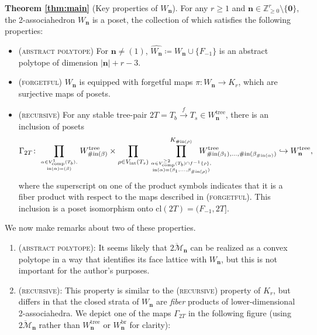 \documentclass[11pt]{amsart}
\theoremstyle{definition}
\theoremstyle{remark}
\theoremstyle{plain}
\newcommand\cM{\mathcal{M}}
\newcommand{\bZ}{\mathbb{Z}}
\newcommand\bn{\mathbf{n}}
\newcommand\bzero{\mathbf{0}}
\newcommand{\on}{\operatorname}
\newcommand{\comp}{C^2}
\renewcommand{\comp}{{\on{comp}}}
\newcommand{\incom}{\on{in}}
\newcommand{\inte}{{\on{int}}}
\newcommand{\tree}{{\on{tree}}}
\newcommand{\br}{{\on{br}}}
\newcommand{\cl}{\mathrm{cl}}
\newcommand{\ol}{\overline}
\newcommand{\sr}{\stackrel}
\newcommand{\wh}{\widehat}
\def\hra{\hookrightarrow}
\begin{document}
\begin{enumerate}
\noindent
{\bf Theorem \ref{thm:main}} (Key properties of $W_\bn$).
For any $r \geq 1$ and $\bn \in \bZ^r_{\geq0}\setminus\{\bzero\}$, the 2-associahedron $W_\bn$ is a poset, the collection of which satisfies the following properties:
\begin{itemize}
\item[] \textsc{(abstract polytope)} For $\bn \neq (1)$, $\wh{W_\bn} \coloneqq W_\bn \cup \{F_{-1}\}$ is an abstract polytope of dimension $|\bn| + r - 3$.

\item[] \textsc{(forgetful)} $W_\bn$ is equipped with forgetful maps $\pi\colon W_\bn \to K_r$, which are surjective maps of posets.

\item[] \textsc{(recursive)} For any stable tree-pair $2T = T_b \sr{f}{\to} T_s \in W_\bn^\tree$, there is an inclusion of posets
\begin{align}
\Gamma_{2T} \colon \prod_{
{\alpha \in V_\comp^1(T_b),}
\atop
{\incom(\alpha)=(\beta)}
} W_{\#\!\incom(\beta)}^\tree
\times
\prod_{\rho \in V_\inte(T_s)} \prod^{K_{\#\!\incom(\rho)}}_{
{\alpha\in V_\comp^{\geq2}(T_b)\cap f^{-1}\{\rho\},}
\atop
{\incom(\alpha)=(\beta_1,\ldots,\beta_{\#\!\incom(\rho)})}
}
\hspace{-0.25in} W^\tree_{\#\!\incom(\beta_1),\ldots,\#\!\incom(\beta_{\#\!\incom(\alpha)})}
\hra W_\bn^\tree,
\end{align}
where the superscript on one of the product symbols indicates that it is a fiber product with respect to the maps described in \textsc{(forgetful)}.
This inclusion is a poset isomorphism onto $\cl(2T) = (F_{-1},2T]$.
\end{itemize}

\medskip

\noindent We now make remarks about two of these properties.

\begin{enumerate}
\item[] \textsc{(abstract polytope):}
It seems likely that $\ol{2\cM}_\bn$ can be realized as a convex polytope in a way that identifies its face lattice with $W_\bn$, but this is not important for the author's purposes.

\smallskip

\item[]
\textsc{(recursive)}:
This property is similar to the \textsc{(recursive)} property of $K_r$, but differs in that the closed strata of $W_\bn$ are \emph{fiber} products of lower-dimensional 2-associahedra.
We depict one of the maps $\Gamma_{2T}$ in the following figure (using $\ol{2\cM}_\bn$ rather than $W_\bn^\tree$ or $W_\bn^\br$ for clarity):


\end{enumerate}
\end{enumerate}
\end{document}
